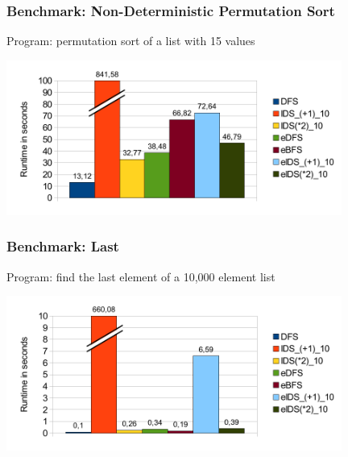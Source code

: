 \documentclass[
,hyperref={pdfpagelabels=false}
]{beamer}
\newcommand{\todo}[1]{\fbox{\sc To do: #1}}
\begin{document}
\begin{frame}%
\frametitle{Benchmark: Non-Deterministic Permutation Sort}
Program: permutation sort of a list with 15 values
\begin{center}
\includegraphics[width=11cm]{gfx/permsort}
\end{center}
\end{frame}

\begin{frame}[fragile]%
\frametitle{Benchmark: Last}
Program: find the last element of a 10,000 element list
\begin{center}
\includegraphics[width=11cm]{gfx/last}
\end{center}
\end{frame}
\end{document}

